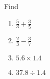 Find
\begin{enumerate}[label=\thesubsection.\arabic*,ref=\thesubsection.\theenumi,itemsep=1ex]
	\item $\frac{5}{3}+\frac{3}{5}$
		\\
		\solution
	
	\item $\frac{2}{3}-\frac{3}{7}$
		\\
		\solution
	
	\item $5.6\times 1.4$
		\\
		\solution
	
	\item $ 37.8\div 1.4$
		\\
		\solution
	
\end{enumerate}
